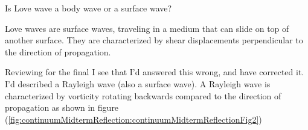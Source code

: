 \begin{Exercise}[title={Love waves}, label={problem:elastic:displacements:midtermQ1d}]
Is Love wave a body wave or a surface wave?
\end{Exercise}

\begin{Answer}[ref={problem:elastic:displacements:midtermQ1d}]
Love waves are surface waves, traveling in a medium that can slide on top of another surface.  They are characterized by shear displacements perpendicular to the direction of propagation.

Reviewing for the final I see that I'd answered this wrong, and have corrected it.  I'd described a Rayleigh wave (also a surface wave).  A Rayleigh wave is characterized by vorticity rotating backwards compared to the direction of propagation as shown in figure (\ref{fig:continuumMidtermReflection:continuumMidtermReflectionFig2})


\end{Answer}

